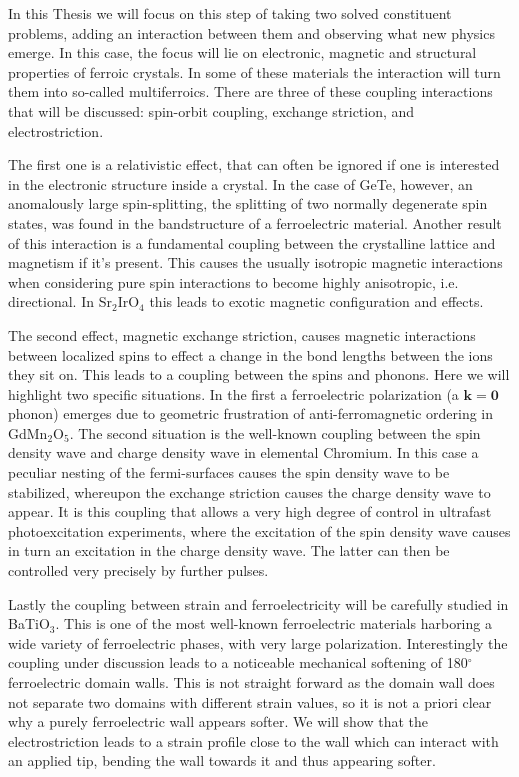 In this Thesis we will focus on this step of taking two solved constituent problems, adding an interaction between them and observing what new physics emerge. In this case, the focus will lie on electronic, magnetic and structural properties of ferroic crystals. In some of these materials the interaction will turn them into so-called multiferroics. 
There are three of these coupling interactions that will be discussed: spin-orbit coupling, exchange striction, and electrostriction.

The first one is a relativistic effect, that can often be ignored if one is interested in the electronic structure inside a crystal. In the case of GeTe, however, an anomalously large spin-splitting, the splitting of two normally degenerate spin states, was found in the bandstructure of a ferroelectric material.
Another result of this interaction is a fundamental coupling between the crystalline lattice and magnetism if it's present. This causes the usually isotropic magnetic interactions when considering pure spin interactions to become highly anisotropic, i.e. directional. In Sr$_2$IrO$_4$ this leads to exotic magnetic configuration and effects.

The second effect, magnetic exchange striction, causes magnetic interactions between localized spins to effect a change in the bond lengths between the ions they sit on. This leads to a coupling between the spins and phonons. Here we will highlight two specific situations. In the first a ferroelectric polarization (a $\bm{k} = \bm{0}$ phonon) emerges due to geometric frustration of anti-ferromagnetic ordering in GdMn$_2$O$_5$. The second situation is the well-known coupling between the spin density wave and charge density wave in elemental Chromium. In this case a peculiar nesting of the fermi-surfaces causes  the spin density wave to be stabilized, whereupon the exchange striction causes the charge density wave to appear.  
It is this coupling that allows a very high degree of control in ultrafast photoexcitation experiments, where the excitation of the spin density wave causes in turn an excitation in the charge density wave. The latter can then be controlled very precisely by further pulses.

Lastly the coupling between strain and ferroelectricity will be carefully studied in BaTiO$_3$. This is one of the most well-known ferroelectric materials harboring a wide variety of ferroelectric phases, with very large polarization. Interestingly the coupling under discussion leads to a noticeable mechanical softening of 180$^\circ$ ferroelectric domain walls. This is not straight forward as the domain wall does not separate two domains with different strain values, so it is not a priori clear why a purely ferroelectric wall appears softer. We will show that the electrostriction leads to a strain profile close to the wall which can interact with an applied tip, bending the wall towards it and thus appearing softer. 

